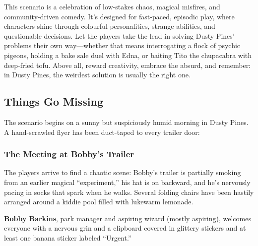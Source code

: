 This scenario is a celebration of low-stakes chaos, magical misfires, and community-driven comedy. It’s designed for fast-paced, episodic play, where characters shine through colourful personalities, strange abilities, and questionable decisions. Let the players take the lead in solving Dusty Pines’ problems their own way—whether that means interrogating a flock of psychic pigeons, holding a bake sale duel with Edna, or baiting Tito the chupacabra with deep-fried tofu. Above all, reward creativity, embrace the absurd, and remember: in Dusty Pines, the weirdest solution is usually the right one.

\subsection{Things Go Missing}

The scenario begins on a sunny but suspiciously humid morning in Dusty Pines. A hand-scrawled flyer has been duct-taped to every trailer door:

\begin{center}
\end{center}

\subsubsection*{The Meeting at Bobby’s Trailer}

The players arrive to find a chaotic scene: Bobby’s trailer is partially smoking from an earlier magical “experiment,” his hat is on backward, and he's nervously pacing in socks that spark when he walks. Several folding chairs have been hastily arranged around a kiddie pool filled with lukewarm lemonade.

\textbf{Bobby Barkins}, park manager and aspiring wizard (mostly aspiring), welcomes everyone with a nervous grin and a clipboard covered in glittery stickers and at least one banana sticker labeled “Urgent.”

